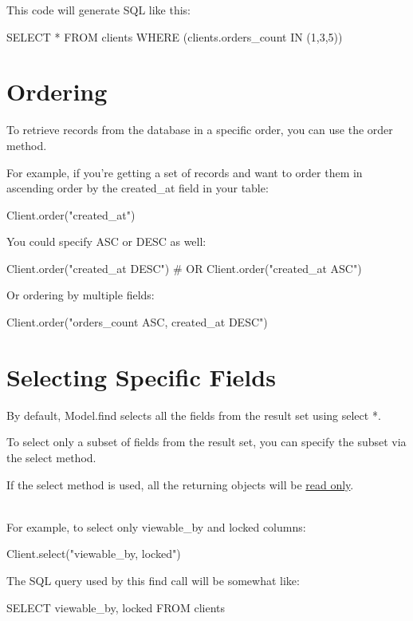 \documentclass[10pt]{book}
\newenvironment{code}{%
  \scriptsize
    \verbatim
}{%
    \endverbatim
    \newline
}
\begin{document}
This code will generate SQL like this:
\begin{code}
SELECT * FROM clients WHERE (clients.orders_count IN (1,3,5))
\end{code}

\section{ Ordering}

To retrieve records from the database in a specific order, you can use the order method.

For example, if you’re getting a set of records and want to order them in ascending order by the created\_at field in your table:
\begin{code}
Client.order("created_at")
\end{code}

You could specify ASC or DESC as well:
\begin{code}
Client.order("created_at DESC")
# OR
Client.order("created_at ASC")
\end{code}

Or ordering by multiple fields:
\begin{code}
Client.order("orders_count ASC, created_at DESC")
\end{code}

\section{ Selecting Specific Fields}

By default, Model.find selects all the fields from the result set using select *.

To select only a subset of fields from the result set, you can specify the subset via the select method.

If the select method is used, all the returning objects will be \hyperlink{readonly-objects}{read only}.


\\

For example, to select only viewable\_by and locked columns:
\begin{code}
Client.select("viewable_by, locked")
\end{code}

The SQL query used by this find call will be somewhat like:
\begin{code}
SELECT viewable_by, locked FROM clients
\end{code}
\end{document}
